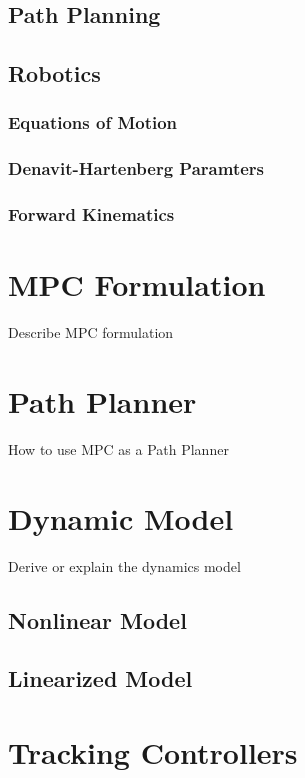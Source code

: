 \documentclass[journal]{IEEEtran}
\begin{document}
\subsection{Path Planning}

\subsection{Robotics}

\subsubsection{Equations of Motion}

\subsubsection{Denavit-Hartenberg Paramters}

\subsubsection{Forward Kinematics}



\section{MPC Formulation}

Describe MPC formulation

\section{Path Planner}

How to use MPC as a Path Planner

\section{Dynamic Model}

Derive or explain the dynamics model

\subsection{Nonlinear Model}

\subsection{Linearized Model}

\section{Tracking Controllers}
\end{document}
